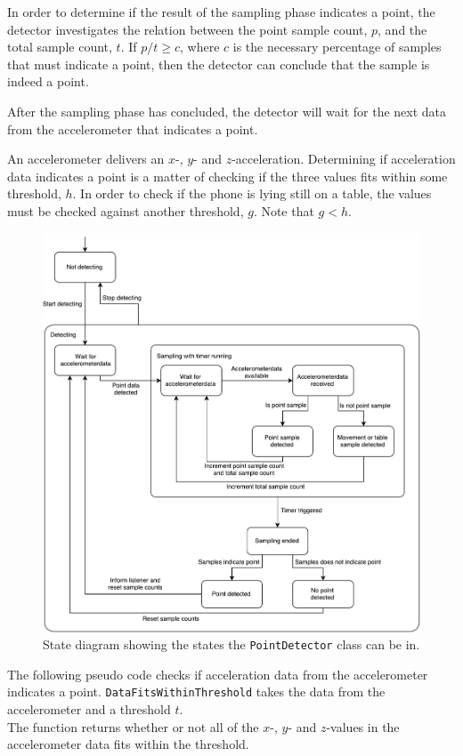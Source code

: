 In order to determine if the result of the sampling phase indicates a point, 
the detector investigates the relation between the point sample count, $p$, 
and the total sample count, $t$. 
If $p/t \geq c$, where $c$ is the necessary percentage of samples that must indicate a point, 
then the detector can conclude that the sample is indeed a point.

After the sampling phase has concluded, 
the detector will wait for the next data from the accelerometer that indicates a point.

An accelerometer delivers an $x$-, $y$- and $z$-acceleration. 
Determining if acceleration data indicates a point is a matter of checking if the three values fits within some threshold, $h$. 
In order to check if the phone is lying still on a table, 
the values must be checked against another threshold, $g$. Note that $g < h$.

\begin{figure}
\centering
\includegraphics[width=\textwidth]{images/point-detector-state-diagram}
\caption{State diagram showing the states the \texttt{PointDetector} class can be in.}
\label{fig:pointdetector-state-diagram}
\end{figure}

The following pseudo code checks if acceleration data from the accelerometer indicates a point. 
\texttt{DataFitsWithinThreshold} takes the data from the accelerometer and a threshold $t$. \\
The function returns whether or not all of the $x$-, $y$- and $z$-values in the accelerometer data fits within the threshold.

